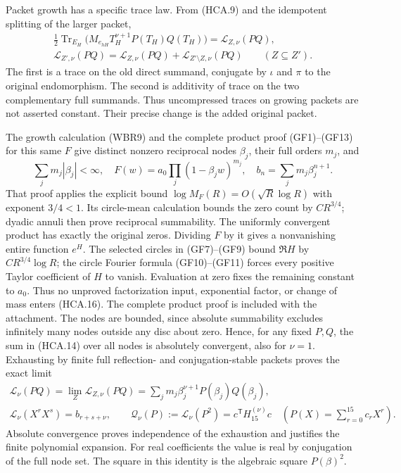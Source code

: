 Packet growth has a specific trace law. From (HCA.9) and the
idempotent splitting of the larger packet,
\[
 \begin{gathered}
 \tfrac12\operatorname{Tr}_{E_H}
  \bigl(M_{e_{hH}}T_H^{\nu+1}P(T_H)Q(T_H)\bigr)
                  =\mathcal L_{Z,\nu}(PQ),\\
 \mathcal L_{Z',\nu}(PQ)=\mathcal L_{Z,\nu}(PQ)
                  +\mathcal L_{Z'\setminus Z,\nu}(PQ)
                      \qquad(Z\subseteq Z').
 \end{gathered}
 \tag{HCA.15}
\]
The first is a trace on the old direct summand, conjugate by
$\iota$ and $\pi$ to the original endomorphism. The second is
additivity of trace on the two complementary full summands.
Thus uncompressed traces on growing packets are not asserted
constant. Their precise change is the added original packet.

The growth calculation (WBR9) and the complete product proof
(GF1)--(GF13) for this same $F$ give
distinct nonzero reciprocal nodes $\beta_j$, their full orders $m_j$,
and
\[
 \sum_jm_j|\beta_j|<\infty,\quad
 F(w)=a_0\prod_j(1-\beta_jw)^{m_j},\quad
 b_n=\sum_jm_j\beta_j^{n+1}.
 \tag{HCA.16}
\]
That proof applies the explicit bound
$\log M_F(R)=O(\sqrt R\log R)$ with exponent $3/4<1$.
Its circle-mean calculation bounds the zero count by $CR^{3/4}$;
dyadic annuli then prove reciprocal summability. The uniformly
convergent product has exactly the original zeros. Dividing $F$
by it gives a nonvanishing entire function $e^H$. The selected
circles in (GF7)--(GF9) bound $\Re H$ by $CR^{3/4}\log R$;
the circle Fourier formula (GF10)--(GF11) forces every positive
Taylor coefficient of $H$ to vanish. Evaluation at zero fixes
the remaining constant to $a_0$. Thus no unproved factorization
input, exponential factor, or change of mass enters (HCA.16).
The complete product proof is included with the attachment. The nodes are
bounded, since absolute summability excludes infinitely many
nodes outside any disc about zero. Hence, for any fixed $P,Q$,
the sum in (HCA.14) over all nodes is absolutely convergent,
also for $\nu=1$. Exhausting by finite full reflection- and
conjugation-stable packets proves the exact limit
\[
 \begin{gathered}
 \mathcal L_\nu(PQ)=\lim_Z\mathcal L_{Z,\nu}(PQ)
     =\sum_jm_j\beta_j^{\nu+1}P(\beta_j)Q(\beta_j),\\
 \mathcal L_\nu(X^rX^s)=b_{r+s+\nu},\qquad
 \mathcal Q_\nu(P):=\mathcal L_\nu(P^2)
            =c^{\mathsf T}H_{15}^{(\nu)}c
                 \quad\left(P(X)=\sum_{r=0}^{15}c_rX^r\right).
 \end{gathered}
 \tag{HCA.17}
\]
Absolute convergence proves independence of the exhaustion and
justifies the finite polynomial expansion. For real coefficients
the value is real by conjugation of the full node set. The square
in this identity is the algebraic square $P(\beta)^2$.

